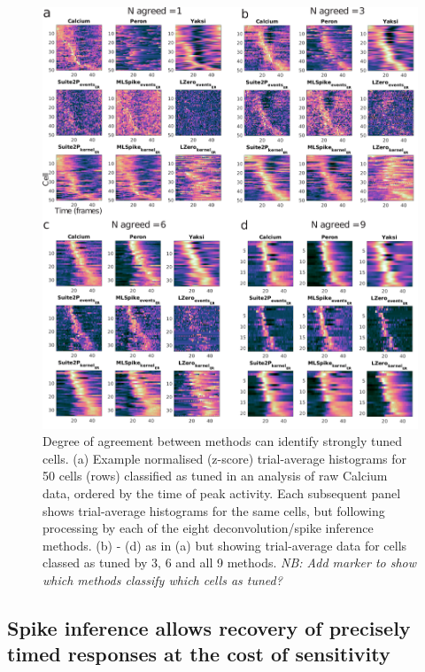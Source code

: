 \documentclass[a4paper,10pt,twocolumn]{article}
\begin{document}
\begin{figure}
\includegraphics[width=\textwidth]{full_figs_19v2/why_deconvolve_F5_19v2.png}
\caption{\label{fig:tuned_cells_psth}Degree of agreement between methods can identify strongly tuned cells. (a) Example normalised (z-score) trial-average histograms for 50 cells (rows) classified as tuned in an analysis of raw Calcium data, ordered by the time of peak activity. Each subsequent panel shows trial-average histograms for the same cells, but following processing by each of the eight deconvolution/spike inference methods. (b) - (d) as in (a) but showing trial-average data for cells classed as tuned by 3, 6 and all 9 methods. \emph{NB: Add marker to show which methods classify which cells as tuned?}}
\end{figure}


\subsection{Spike inference allows recovery of precisely timed responses at the cost of sensitivity}
\end{document}
